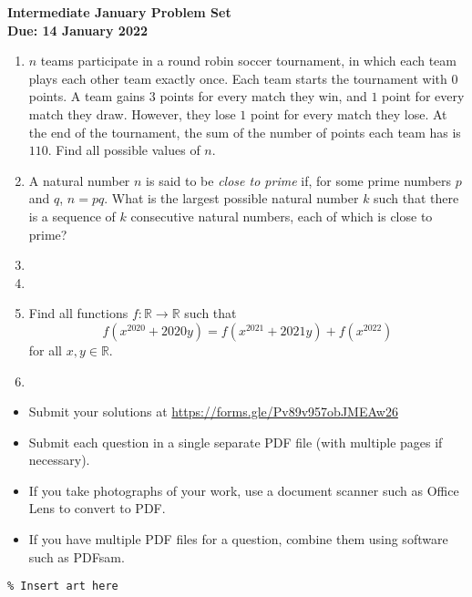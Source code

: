 \documentclass{article}
\begin{document}
\thispagestyle{empty}

\begin{center}
  \textbf{\Large Intermediate January Problem Set}
  \\ \vspace{1em}
  \textbf{\large Due: 14 January 2022}
\end{center}

\bigskip

\begin{enumerate}[itemsep=\fill]

\item %
$n$ teams participate in a round robin soccer tournament, in which each team plays each other team exactly once. Each team starts the tournament with $0$ points. A team gains $3$ points for every match they win, and $1$ point for every match they draw. However, they lose $1$ point for every match they lose. At the end of the tournament, the sum of the number of points each team has is $110$. Find all possible values of $n$.

\item %
A natural number $n$ is said to be \textit{close to prime} if, for some prime numbers $p$ and $q$, $n = pq$. What is the largest possible natural number $k$ such that there is a sequence of $k$ consecutive natural numbers, each of which is close to prime?


\item %


\item %


\item %
Find all functions $f : \mathbb{R} \to \mathbb{R}$ such that
\[ f(x^{2020} +2020y) = f(x^{2021} +2021y) +f(x^{2022}) \]
for all $x,y \in \mathbb{R}$.


\item %

\end{enumerate}


\vfill
\small
\begin{itemize}
	\item Submit your solutions at \href{https://forms.gle/Pv89v957obJMEAw26}{https://forms.gle/Pv89v957obJMEAw26}
	\item Submit each question in a single separate PDF file (with multiple pages if necessary).
	\item If you take photographs of your work, use a document scanner such as Office Lens to convert to PDF.
	\item If you have multiple PDF files for a question, combine them using software such as PDFsam.
\end{itemize}

\vfill
\centering
\small
\begin{BVerbatim}
\end{BVerbatim}
\end{document}
